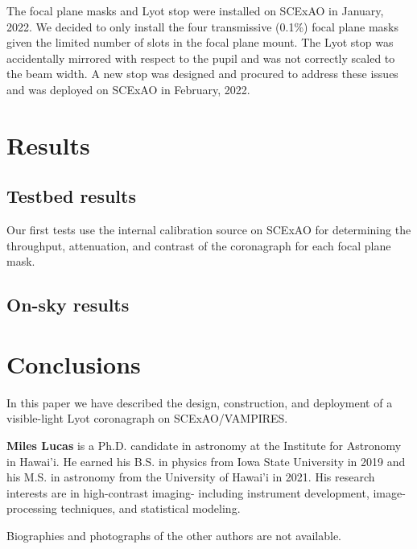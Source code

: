 \documentclass[12pt]{spieman}  %
\begin{document}
\begin{spacing}{2}
The focal plane masks and Lyot stop were installed on SCExAO in January, 2022. We decided to only install the four  transmissive (0.1\%) focal plane masks given the limited number of slots in the focal plane mount. The Lyot stop was accidentally mirrored with respect to the pupil and was not correctly scaled to the beam width. A new stop was designed and procured to address these issues and was deployed on SCExAO in February, 2022.

\section{Results}\label{sec:results}

\subsection{Testbed results}\label{sec:testbed}

Our first tests use the internal calibration source on SCExAO for determining the throughput, attenuation, and contrast of the coronagraph for each focal plane mask. 

\subsection{On-sky results}\label{sec:onsky}

\section{Conclusions}\label{sec:conclusions}

In this paper we have described the design, construction, and deployment of a visible-light Lyot coronagraph on SCExAO/VAMPIRES. 




\vspace{2ex}\noindent\textbf{Miles Lucas} is a Ph.D. candidate in astronomy at the Institute for Astronomy in Hawai'i. He earned his B.S. in physics from Iowa State University in 2019 and his M.S. in astronomy from the University of Hawai'i in 2021. His research interests are in high-contrast imaging- including instrument development, image-processing techniques, and statistical modeling.

\vspace{1ex}
\noindent Biographies and photographs of the other authors are not available.

\listoffigures
\listoftables

\end{spacing}
\end{document}
